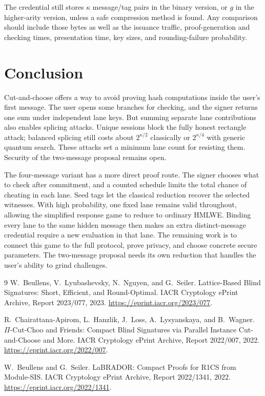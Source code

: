 \documentclass[10pt]{article}
\begin{document}
The credential still stores $\kappa$ message/tag pairs in the binary version,
or $g$ in the higher-arity version, unless a safe compression method is found.
Any comparison should include those bytes as well as the issuance traffic,
proof-generation and checking times, presentation time, key sizes, and
rounding-failure probability.

\section{Conclusion}

Cut-and-choose offers a way to avoid proving hash computations inside the
user's first message.  The user opens some branches for checking, and the
signer returns one sum under independent lane keys.  But summing separate
lane contributions also enables splicing attacks.  Unique sessions block
the fully honest rectangle attack; balanced splicing still costs about
$2^{\kappa/2}$ classically or $2^{\kappa/4}$ with generic quantum search.
These attacks set a minimum lane count for resisting them.  Security of the
two-message proposal remains open.

The four-message variant has a more direct proof route.  The signer chooses
what to check after commitment, and a counted schedule limits the total
chance of cheating in each lane.  Seed tags let the classical reduction
recover the selected witnesses.  With high probability, one fixed lane
remains valid throughout, allowing the simplified response game to reduce to
ordinary HMLWE.  Binding every lane to the same hidden message then makes an
extra distinct-message credential require a new evaluation in that lane.
The remaining work is to connect this game to the full protocol, prove
privacy, and choose concrete secure parameters.  The two-message proposal
needs its own reduction that handles the user's ability to grind challenges.

\begin{thebibliography}{9}
W.~Beullens, V.~Lyubashevsky, N.~Nguyen, and G.~Seiler.
\newblock Lattice-Based Blind Signatures: Short, Efficient, and Round-Optimal.
\newblock IACR Cryptology ePrint Archive, Report 2023/077, 2023.
\newblock \url{https://eprint.iacr.org/2023/077}.

R.~Chairattana-Apirom, L.~Hanzlik, J.~Loss, A.~Lysyanskaya, and B.~Wagner.
\newblock $\Pi$-Cut-Choo and Friends: Compact Blind Signatures via Parallel
Instance Cut-and-Choose and More.
\newblock IACR Cryptology ePrint Archive, Report 2022/007, 2022.
\newblock \url{https://eprint.iacr.org/2022/007}.

W.~Beullens and G.~Seiler.
\newblock LaBRADOR: Compact Proofs for R1CS from Module-SIS.
\newblock IACR Cryptology ePrint Archive, Report 2022/1341, 2022.
\newblock \url{https://eprint.iacr.org/2022/1341}.

\end{thebibliography}
\end{document}
